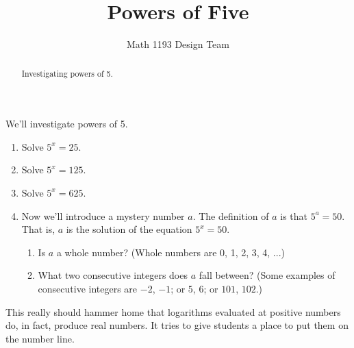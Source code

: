 \documentclass[noauthor]{ximera}
\title{Powers of Five}
\author{Math 1193 Design Team}
\begin{document}
\begin{abstract}
    Investigating powers of 5.
\end{abstract}
\maketitle

We'll investigate powers of 5.

\begin{enumerate}
    \item Solve \(5^x = 25\). 
    \item Solve \(5^x = 125\).
    \item Solve \(5^x = 625\).
    \item Now we'll introduce a mystery number \(a\). The
    definition of \(a\) is that \(5^a = 50\). That is, \(a\)
    is the solution of the equation \(5^x = 50\).
    \begin{enumerate}
        \item Is \(a\) a whole number? (Whole numbers are 0, 1, 2, 3, 4, ...)
        \item What two consecutive integers does \(a\) fall between? (Some 
        examples of consecutive integers are \(-2\), \(-1\); or \(5\), \(6\); or \(101\), \(102\).)
    \end{enumerate}
\end{enumerate}

\begin{instructorNotes}
This really should hammer home that logarithms evaluated at positive numbers
do, in fact, produce real numbers. It tries to give students a place to 
put them on the number line. 
\end{instructorNotes}
\end{document}
